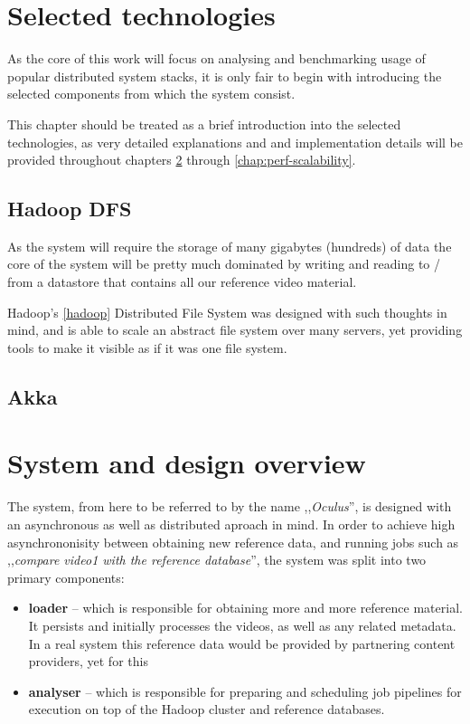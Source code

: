 \chapter{Selected technologies}
As the core of this work will focus on analysing and benchmarking usage of popular distributed system stacks, it is only fair to begin with introducing the selected components from which the system consist.

This chapter should be treated as a brief introduction into the selected technologies, as very detailed explanations and and implementation details will be provided throughout chapters \ref{chap:system-design} through \ref{chap:perf-scalability}.

\section{Hadoop DFS}
As the system will require the storage of many gigabytes (hundreds) of data the core of the system will be pretty much dominated by writing and reading to / from a datastore that contains all our reference video material.

Hadoop's \ref{hadoop} Distributed File System was designed with such thoughts in mind, and is able to scale an abstract file system over many servers, yet providing tools to make it visible as if it was one file system.

\section{Akka}


\chapter{System and design overview}
\label{chap:system-design}

The system, from here to be referred to by the name ,,\textit{Oculus}'', is designed with an asynchronous as well as distributed aproach in mind. In order to achieve high asynchrononisity between obtaining new reference data, and running jobs such as ,,\textit{compare video1 with the reference database}'', the system was split into two primary components: 

\begin{itemize}
  \item \textbf{loader} -- which is responsible for obtaining more and more reference material. It persists and initially processes the videos, as well as any related metadata. In a real system this reference data would be provided by partnering content providers, yet for this 
  \item \textbf{analyser} -- which is responsible for preparing and scheduling job pipelines for execution on top of the Hadoop cluster and reference databases.
\end{itemize}


